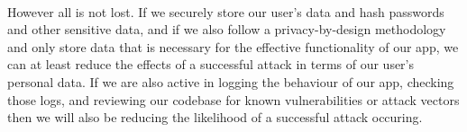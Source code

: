 \documentclass[12pt, a4paper, oneside]{book}
\begin{document}
{\paragraph{} However all is not lost. If we securely store our user's data and hash passwords and other sensitive data, and if we also follow a privacy-by-design methodology and only store data that is necessary for the effective functionality of our app, we can at least reduce the effects of a successful attack in terms of our user's personal data. If we are also active in logging the behaviour of our app, checking those logs, and reviewing our codebase for known vulnerabilities or attack vectors then we will also be reducing the likelihood of a successful attack occuring.













}
\end{document}
